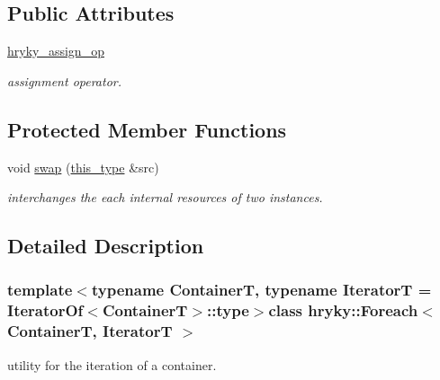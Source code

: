 \subsection*{Public Attributes}
\begin{DoxyCompactItemize}
\item 
\hypertarget{classhryky_1_1_foreach_adb929133383d80020ed63d371efa71a8}{\hyperlink{classhryky_1_1_foreach_adb929133383d80020ed63d371efa71a8}{hryky\-\_\-assign\-\_\-op}}\label{classhryky_1_1_foreach_adb929133383d80020ed63d371efa71a8}

\begin{DoxyCompactList}\small\item\em assignment operator. \end{DoxyCompactList}\end{DoxyCompactItemize}
\subsection*{Protected Member Functions}
\begin{DoxyCompactItemize}
\item 
\hypertarget{classhryky_1_1_foreach_a3c8dd1fa22806ebb2966caeed1280960}{void \hyperlink{classhryky_1_1_foreach_a3c8dd1fa22806ebb2966caeed1280960}{swap} (\hyperlink{classhryky_1_1_foreach_a57418e3f3130d8e58f62b54d6c209798}{this\-\_\-type} \&src)}\label{classhryky_1_1_foreach_a3c8dd1fa22806ebb2966caeed1280960}

\begin{DoxyCompactList}\small\item\em interchanges the each internal resources of two instances. \end{DoxyCompactList}\end{DoxyCompactItemize}


\subsection{Detailed Description}
\subsubsection*{template$<$typename Container\-T, typename Iterator\-T = Iterator\-Of$<$\-Container\-T$>$\-::type$>$class hryky\-::\-Foreach$<$ Container\-T, Iterator\-T $>$}

utility for the iteration of a container. 

